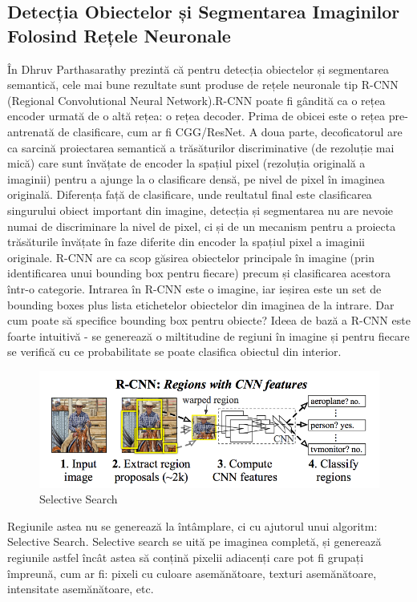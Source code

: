\subsection{Detecția Obiectelor și Segmentarea Imaginilor Folosind Rețele Neuronale}
În \cite{historyCNN} Dhruv Parthasarathy prezintă că pentru detecția obiectelor și segmentarea semantică, cele mai bune rezultate sunt produse de rețele neuronale tip R-CNN (Regional Convolutional Neural Network).R-CNN poate fi gândită ca o rețea encoder urmată de o altă rețea: o rețea decoder. Prima de obicei este o rețea pre-antrenată de clasificare, cum ar fi CGG/ResNet. A doua parte, decoficatorul are ca sarcină proiectarea semantică a trăsăturilor discriminative (de rezoluție mai mică) care sunt învățate de encoder la spațiul pixel (rezoluția originală a imaginii) pentru a ajunge la o clasificare densă, pe nivel de pixel în imaginea originală.\newline
Diferența față de clasificare, unde reultatul final este clasificarea singurului obiect important din imagine, detecția și segmentarea nu are nevoie numai de discriminare la nivel de pixel, ci și de un mecanism pentru a proiecta trăsăturile învățate în faze diferite din encoder la spațiul pixel a imaginii originale.\newline
 R-CNN are ca scop găsirea obiectelor principale în imagine (prin identificarea unui bounding box pentru fiecare) precum și clasificarea acestora într-o categorie. Intrarea în R-CNN este o imagine, iar ieșirea este un set de bounding boxes plus lista etichetelor obiectelor din imaginea de la intrare. Dar cum poate să specifice bounding box pentru obiecte? Ideea de bază a R-CNN este foarte intuitivă - se generează o miltitudine de regiuni în imagine și pentru fiecare se verifică cu ce probabilitate se poate clasifica obiectul din interior.\newline
\begin{figure}[h!]
    	\centering
	\captionsetup{justification=centering, margin=2cm}
	\includegraphics[width=1.0\textwidth]{figures/selective_search.png}
	\caption{Selective Search \cite{selective_search}}
	\label{fig:selective_search}
\end{figure}
Regiunile astea nu se generează la întâmplare, ci cu ajutorul unui algoritm: Selective Search. Selective search se uită pe imaginea completă, și generează regiunile astfel încât astea să conțină pixelii adiacenți care pot fi grupați împreună, cum ar fi: pixeli cu culoare asemănătoare, texturi asemănătoare, intensitate asemănătoare, etc.\newline

